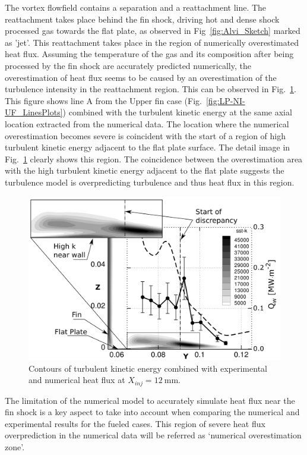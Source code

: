 \documentclass{AIAA}
\begin{document}
The vortex flowfield contains a separation and a reattachment line. The reattachment takes place behind the fin shock, driving hot and dense shock processed gas towards the flat plate, as observed in Fig~\ref{fig:Alvi_Sketch} marked as 'jet'. This reattachment takes place in the region of numerically overestimated heat flux. Assuming the temperature of the gas and its composition after being processed by the fin shock are accurately predicted numerically, the overestimation of heat flux seems to be caused by an overestimation of the turbulence intensity in the reattachment region. This can be observed in Fig.~\ref{fig:SSTk_Q_Combi}. This figure shows line A from the Upper fin case (Fig.~\ref{fig:LP-NI-UF_LinesPlots}) combined with the turbulent kinetic energy at the same axial location extracted from the numerical data. The location where the numerical overestimation becomes severe is coincident with the start of a region of high turbulent kinetic energy adjacent to the flat plate surface. The detail image in Fig.~\ref{fig:SSTk_Q_Combi} clearly shows this region. The coincidence between the overestimation area with the high turbulent kinetic energy adjacent to the flat plate suggests the turbulence model is overpredicting turbulence and thus heat flux in this region.
%
\begin{figure}[!h]
\center
\includegraphics[width=0.70\columnwidth,valign=t]{Figures/SST-K_X137_LP_NI_UF_Q_and_SSTk_Combined.pdf}
\caption{Contours of turbulent kinetic energy combined with experimental and numerical heat flux at $X_{inj} = \SI{12}{\milli\meter}$.}
\label{fig:SSTk_Q_Combi}
\end{figure} 

The limitation of the numerical model to accurately simulate heat flux near the fin shock is a key aspect to take into account when comparing the numerical and experimental results for the fueled cases. 
This region of severe heat flux overprediction in the numerical data will be referred as `numerical overestimation zone'.
\end{document}

